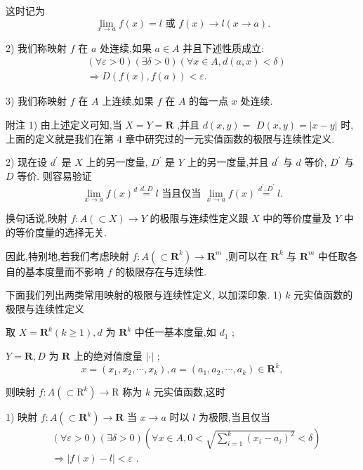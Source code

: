 这时记为
$$\mathop{\lim }\limits_{{x \rightarrow  a}}f\left( x\right)  = l\text{ 或 }f\left( x\right)  \rightarrow  l\left( {x \rightarrow  a}\right) .$$

2) 我们称映射 $f$ 在 $a$ 处连续,如果 $a \in  A$ 并且下述性质成立:
\begin{align*}
	&\left( {\forall \varepsilon  > 0}\right) \left( {\exists \delta  > 0}\right) \left( {\forall x \in  A,d\left( {a,x}\right)  < \delta }\right)\\
	&\Rightarrow  D\left( {f\left( x\right) ,f\left( a\right) }\right)  < \varepsilon .
\end{align*}

3) 我们称映射 $f$ 在 $A$ 上连续,如果 $f$ 在 $A$ 的每一点 $x$ 处连续.

附注 1) 由上述定义可知,当 $X = Y = \mathbf{R}$ ,并且 $d\left( {x,y}\right)  =$  $D\left( {x,y}\right)  = \left| {x - y}\right|$ 时,上面的定义就是我们在第 4 章中研究过的一元实值函数的极限与连续性定义.

2) 现在设 ${d}^{\prime }$ 是 $X$ 上的另一度量, ${D}^{\prime }$ 是 $Y$ 上的另一度量,并且 ${d}^{\prime }$ 与 $d$ 等价, ${D}^{\prime }$ 与 $D$ 等价. 则容易验证
$$\mathop{\lim }\limits_{{x \rightarrow  a}}f{\left( x\right) }^{d}\overset{d,D}{ = }l\text{ 当且仅当 }\mathop{\lim }\limits_{{x \rightarrow  a}}f\left( x\right) \overset{{d}^{\prime },{D}^{\prime }}{ = }l.$$

换句话说,映射 $f : A\left( { \subset  X}\right)  \rightarrow  Y$ 的极限与连续性定义跟 $X$ 中的等价度量及 $Y$ 中的等价度量的选择无关.

因此,特别地,若我们考虑映射 $f : A\left( { \subset  {\mathbf{R}}^{k}}\right)  \rightarrow  {\mathbf{R}}^{m}$ ,则可以在 ${\mathbf{R}}^{k}$ 与 ${\mathbf{R}}^{m}$ 中任取各自的基本度量而不影响 $f$ 的极限存在与连续性.

下面我们列出两类常用映射的极限与连续性定义, 以加深印象. 1) $k$ 元实值函数的极限与连续性定义

取 $X = {\mathbf{R}}^{k}\left( {k \geq  1}\right) ,d$ 为 ${\mathbf{R}}^{k}$ 中任一基本度量,如 ${d}_{1}$ ;

$Y = \mathbf{R},D$ 为 $\mathbf{R}$ 上的绝对值度量 $\left| \cdot \right|$ ;
$$x = \left( {{x}_{1},{x}_{2},\cdots ,{x}_{k}}\right) ,a = \left( {{a}_{1},{a}_{2},\cdots ,{a}_{k}}\right)  \in  {\mathbf{R}}^{k},$$

则映射 $f : A\left( { \subset  {\mathrm{R}}^{k}}\right)  \rightarrow  \mathrm{R}$ 称为 $k$ 元实值函数,这时

1) 映射 $f : A\left( { \subset  {\mathbf{R}}^{k}}\right)  \rightarrow  \mathbf{R}$ 当 $x \rightarrow  a$ 时以 $l$ 为极限,当且仅当
\begin{align*}
	&\left( {\forall \varepsilon  > 0}\right) \left( {\exists \delta  > 0}\right) \left( {\forall x \in  A,0 < \sqrt{\mathop{\sum }\limits_{{i = 1}}^{k}{\left( {x}_{i} - {a}_{i}\right) }^{2}} < \delta }\right)\\
	&\Rightarrow  \left| {f\left( x\right)  - l}\right|  < \varepsilon \text{ . }
\end{align*}

